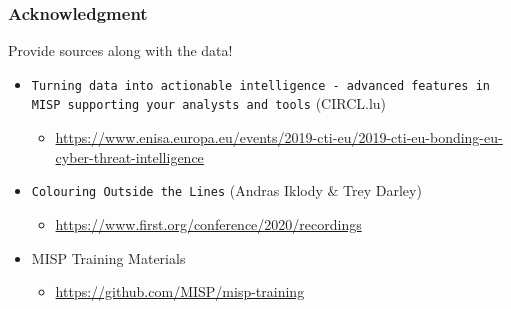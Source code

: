 \begin{frame}
    \frametitle{Acknowledgment}
    Provide sources along with the data!
    \begin{itemize}
        \item \texttt{Turning data into actionable intelligence - advanced features in MISP supporting your analysts and tools} (CIRCL.lu)
        \begin{itemize}
            \item \tiny{\url{https://www.enisa.europa.eu/events/2019-cti-eu/2019-cti-eu-bonding-eu-cyber-threat-intelligence}}
        \end{itemize}
        \item \texttt{Colouring Outside the Lines} (Andras Iklody \& Trey Darley)
        \begin{itemize}
            \item \tiny{\url{https://www.first.org/conference/2020/recordings}}
        \end{itemize}
        \item MISP Training Materials
        \begin{itemize}
            \item \tiny{\url{https://github.com/MISP/misp-training}}
        \end{itemize}
    \end{itemize}
\end{frame}